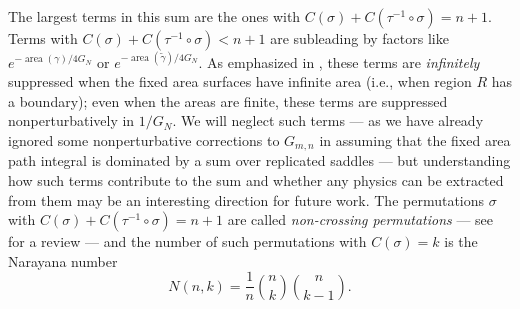 \documentclass[a4paper,11pt]{article}
\renewcommand{\tilde}{\widetilde}
\newcommand{\area}{\operatorname{area}}
\begin{document}
The largest terms in this sum are the ones with $C(\sigma) + C(\tau^{-1} \circ \sigma) = n+1$. Terms with $C(\sigma) + C(\tau^{-1} \circ \sigma) < n + 1$ are subleading by factors like $e^{- \area(\gamma) / 4G_N}$ or $e^{- \area(\tilde{\gamma}) / 4 G_N}$. As emphasized in \cite{akers-penington}, these terms are \emph{infinitely} suppressed when the fixed area surfaces have infinite area (i.e., when region $R$ has a boundary); even when the areas are finite, these terms are suppressed nonperturbatively in $1/G_N$. We will neglect such terms --- as we have already ignored some nonperturbative corrections to $G_{m, n}$ in assuming that the fixed area path integral is dominated by a sum over replicated saddles --- but understanding how such terms contribute to the sum and whether any physics can be extracted from them may be an interesting direction for future work. The permutations $\sigma$ with $C(\sigma) + C(\tau^{-1} \circ \sigma) = n +1$ are called \emph{non-crossing permutations} --- see \cite{mingo2004annular} for a review --- and the number of such permutations with $C(\sigma) = k$ is the Narayana number
\begin{equation}
    N(n, k) = \frac{1}{n} {n \choose k} {n \choose k-1}.
\end{equation}
\end{document}

